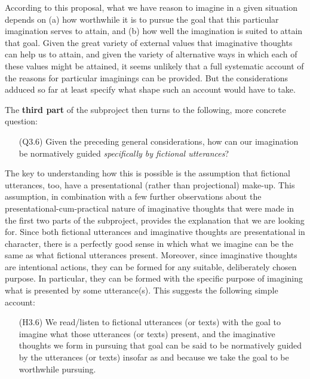 \noindent According to this proposal, what we have reason to imagine in a given situation depends on (a) how worthwhile it is to pursue the goal that this particular imagination serves to attain, and (b) how well the imagination is suited to attain that goal. Given the great variety of external values that imaginative thoughts can help us to attain, and given the variety of alternative ways in which each of these values might be attained, it seems unlikely that a full systematic account of the reasons for particular imaginings can be provided. But the considerations adduced so far at least specify what shape such an account would have to take.

The \textbf{third part} of the subproject then turns to the following, more concrete question:

\vspace{-.1cm}
\begin{itemize}[leftmargin=2cm]
\item[(Q3.6)] Given the preceding general considerations, how can our imagination be normatively guided \emph{specifically by fictional utterances}?
\end{itemize}
\vspace{-.1cm}
 
\noindent The key to understanding how this is possible is the assumption that fictional utterances, too, have a presentational (rather than projectional) make-up. This assumption, in combination with a few further observations about the presentational-cum-practical nature of imaginative thoughts that were made in the first two parts of the subproject, provides the explanation that we are looking for. Since both fictional utterances and imaginative thoughts are presentational in character, there is a perfectly good sense in which what we imagine can be the same as what fictional utterances present. Moreover, since imaginative thoughts are intentional actions, they can be formed for any suitable, deliberately chosen purpose. In particular, they can be formed with the specific purpose of imagining what is presented by some utterance(s). This suggests the following simple account:

\vspace{-.1cm}
\begin{itemize}[leftmargin=2cm]
\item[(H3.6)] We read/listen to fictional utterances (or texts) with the goal to imagine what those utterances (or texts) present, and the imaginative thoughts we form in pursuing that goal can be said to be normatively guided by the utterances (or texts) insofar as and because we take the goal to be worthwhile pursuing.
\end{itemize}
\vspace{-.1cm}

